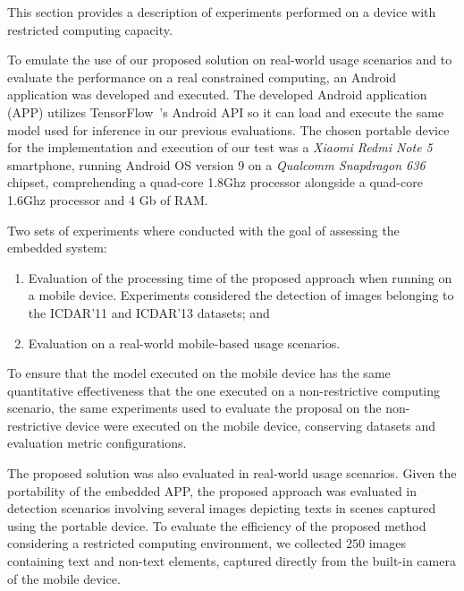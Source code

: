This section provides a description of experiments performed on a device with restricted computing capacity. %

To emulate the use of our proposed solution on real-world usage scenarios and to evaluate the performance on a real constrained computing, an Android application was developed and executed. The developed Android application (APP) utilizes TensorFlow~\cite{tensorflow}'s Android API so it can load and execute the same model used for inference in our previous evaluations. 
The chosen portable device for the implementation and execution of our test was a \textit{Xiaomi Redmi Note 5} smartphone, running Android OS version 9 on a \textit{Qualcomm Snapdragon 636} chipset, comprehending a quad-core 1.8Ghz processor alongside a quad-core 1.6Ghz processor and 4 Gb of RAM.

Two sets of experiments where conducted with the goal of assessing the embedded system: 
\begin{enumerate}
    \item Evaluation of the processing time of the proposed approach when running on a mobile device. Experiments considered the detection of images belonging to the ICDAR'11 and ICDAR'13 datasets; and
    \item Evaluation on a real-world mobile-based usage scenarios.
\end{enumerate}

To ensure that the model executed on the mobile device has the same quantitative effectiveness that the one executed on a non-restrictive computing scenario, the same experiments used to evaluate the proposal on the non-restrictive device were executed on the mobile device, conserving datasets and evaluation metric configurations.

The proposed solution was also evaluated in real-world usage scenarios. Given the portability of the embedded APP, the proposed approach was evaluated in detection scenarios involving several images depicting texts in scenes captured using the portable device. To evaluate the efficiency of the proposed method considering a restricted computing environment, we collected $250$ images containing text and non-text elements, captured directly from the built-in camera of the mobile device.


